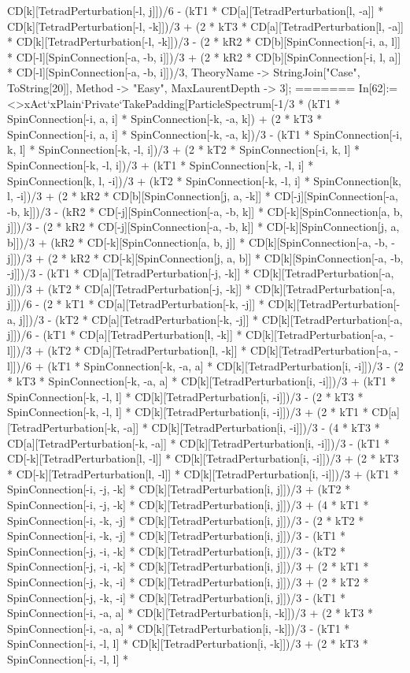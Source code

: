 CD[k][TetradPerturbation[-l, j]])/6 - (kT1 * CD[a][TetradPerturbation[l, -a]] * CD[k][TetradPerturbation[-l, -k]])/3 + (2 * kT3 * CD[a][TetradPerturbation[l, -a]] * CD[k][TetradPerturbation[-l, -k]])/3 - (2 * kR2 * CD[b][SpinConnection[-i, a, l]] * CD[-l][SpinConnection[-a, -b, i]])/3 + (2 * kR2 * CD[b][SpinConnection[-i, l, a]] * CD[-l][SpinConnection[-a, -b, i]])/3, TheoryName -> StringJoin["Case", ToString[20]], Method -> "Easy", MaxLaurentDepth -> 3]; 
=======
In[62]:= <>xAct`xPlain`Private`TakePadding[ParticleSpectrum[-1/3 * (kT1 * SpinConnection[-i, a, i] * SpinConnection[-k, -a, k]) + (2 * kT3 * SpinConnection[-i, a, i] * SpinConnection[-k, -a, k])/3 - (kT1 * SpinConnection[-i, k, l] * SpinConnection[-k, -l, i])/3 + (2 * kT2 * SpinConnection[-i, k, l] * SpinConnection[-k, -l, i])/3 + (kT1 * SpinConnection[-k, -l, i] * SpinConnection[k, l, -i])/3 + (kT2 * SpinConnection[-k, -l, i] * SpinConnection[k, l, -i])/3 + (2 * kR2 * CD[b][SpinConnection[j, a, -k]] * CD[-j][SpinConnection[-a, -b, k]])/3 - (kR2 * CD[-j][SpinConnection[-a, -b, k]] * CD[-k][SpinConnection[a, b, j]])/3 - (2 * kR2 * CD[-j][SpinConnection[-a, -b, k]] * CD[-k][SpinConnection[j, a, b]])/3 + (kR2 * CD[-k][SpinConnection[a, b, j]] * CD[k][SpinConnection[-a, -b, -j]])/3 + (2 * kR2 * CD[-k][SpinConnection[j, a, b]] * CD[k][SpinConnection[-a, -b, -j]])/3 - (kT1 * CD[a][TetradPerturbation[-j, -k]] * CD[k][TetradPerturbation[-a, j]])/3 + (kT2 * CD[a][TetradPerturbation[-j, -k]] * CD[k][TetradPerturbation[-a, j]])/6 - (2 * kT1 * CD[a][TetradPerturbation[-k, -j]] * CD[k][TetradPerturbation[-a, j]])/3 - (kT2 * CD[a][TetradPerturbation[-k, -j]] * CD[k][TetradPerturbation[-a, j]])/6 - (kT1 * CD[a][TetradPerturbation[l, -k]] * CD[k][TetradPerturbation[-a, -l]])/3 + (kT2 * CD[a][TetradPerturbation[l, -k]] * CD[k][TetradPerturbation[-a, -l]])/6 + (kT1 * SpinConnection[-k, -a, a] * CD[k][TetradPerturbation[i, -i]])/3 - (2 * kT3 * SpinConnection[-k, -a, a] * CD[k][TetradPerturbation[i, -i]])/3 + (kT1 * SpinConnection[-k, -l, l] * CD[k][TetradPerturbation[i, -i]])/3 - (2 * kT3 * SpinConnection[-k, -l, l] * CD[k][TetradPerturbation[i, -i]])/3 + (2 * kT1 * CD[a][TetradPerturbation[-k, -a]] * CD[k][TetradPerturbation[i, -i]])/3 - (4 * kT3 * CD[a][TetradPerturbation[-k, -a]] * CD[k][TetradPerturbation[i, -i]])/3 - (kT1 * CD[-k][TetradPerturbation[l, -l]] * CD[k][TetradPerturbation[i, -i]])/3 + (2 * kT3 * CD[-k][TetradPerturbation[l, -l]] * CD[k][TetradPerturbation[i, -i]])/3 + (kT1 * SpinConnection[-i, -j, -k] * CD[k][TetradPerturbation[i, j]])/3 + (kT2 * SpinConnection[-i, -j, -k] * CD[k][TetradPerturbation[i, j]])/3 + (4 * kT1 * SpinConnection[-i, -k, -j] * CD[k][TetradPerturbation[i, j]])/3 - (2 * kT2 * SpinConnection[-i, -k, -j] * CD[k][TetradPerturbation[i, j]])/3 - (kT1 * SpinConnection[-j, -i, -k] * CD[k][TetradPerturbation[i, j]])/3 - (kT2 * SpinConnection[-j, -i, -k] * CD[k][TetradPerturbation[i, j]])/3 + (2 * kT1 * SpinConnection[-j, -k, -i] * CD[k][TetradPerturbation[i, j]])/3 + (2 * kT2 * SpinConnection[-j, -k, -i] * CD[k][TetradPerturbation[i, j]])/3 - (kT1 * SpinConnection[-i, -a, a] * CD[k][TetradPerturbation[i, -k]])/3 + (2 * kT3 * SpinConnection[-i, -a, a] * CD[k][TetradPerturbation[i, -k]])/3 - (kT1 * SpinConnection[-i, -l, l] * CD[k][TetradPerturbation[i, -k]])/3 + (2 * kT3 * SpinConnection[-i, -l, l] * 